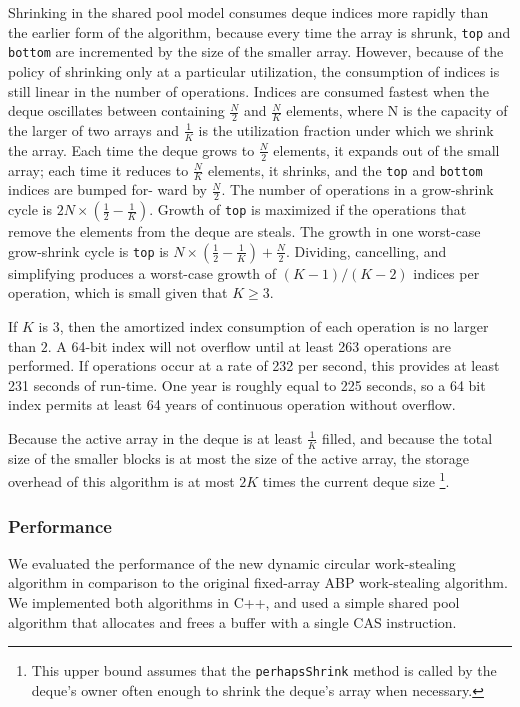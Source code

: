 Shrinking in the shared pool model consumes deque indices more rapidly
than the earlier form of the algorithm, because every time the array
is shrunk, \lstinline!top! and \lstinline!bottom! are incremented by
the size of the smaller array. However, because of the policy of
shrinking only at a particular utilization, the consumption of indices
is still linear in the number of operations. Indices are consumed
fastest when the deque oscillates between containing $\frac{N}{2}$ and
$\frac{N}{K}$ elements, where N is the capacity of the larger of two
arrays and $\frac{1}{K}$ is the utilization fraction under which we
shrink the array. Each time the deque grows to $\frac{N}{2}$ elements,
it expands out of the small array; each time it reduces to
$\frac{N}{K}$ elements, it shrinks, and the \lstinline!top! and
\lstinline!bottom! indices are bumped for- ward by $\frac{N}{2}$. The
number of operations in a grow-shrink cycle is $2N \times (\frac{1}{2}
- \frac{1}{K})$. Growth of \lstinline!top! is maximized if the
operations that remove the elements from the deque are steals. The
growth in one worst-case grow-shrink cycle is \lstinline!top! is $N
\times (\frac{1}{2} - \frac{1}{K}) + \frac{N}{2}$. Dividing,
cancelling, and simplifying produces a worst-case growth of $(K -
1)/(K - 2)$ indices per operation, which is small given that $K \ge
3$.

If $K$ is $3$, then the amortized index consumption of each operation
is no larger than $2$. A 64-bit index will not overflow until at least
263 operations are performed. If operations occur at a rate of 232 per
second, this provides at least 231 seconds of run-time. One year is
roughly equal to 225 seconds, so a 64 bit index permits at least 64
years of continuous operation without overflow.

Because the active array in the deque is at least $\frac{1}{K}$
filled, and because the total size of the smaller blocks is at most
the size of the active array, the storage overhead of this algorithm
is at most $2K$ times the current deque size \footnote{This upper
  bound assumes that the \lstinline!perhapsShrink! method is called by
  the deque's owner often enough to shrink the deque’s array when
  necessary.}.

\subsubsection{Performance}

We evaluated the performance of the new dynamic circular work-stealing
algorithm in comparison to the original fixed-array ABP work-stealing
algorithm. We implemented both algorithms in C++, and used a simple
shared pool algorithm that allocates and frees a buffer with a single
CAS instruction.

